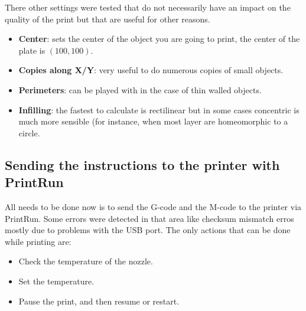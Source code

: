 \documentclass{article}
\begin{document}
There other settings were tested that do not necessarily have an impact on the quality of the print but that are useful for other reasons.
\begin{itemize}
\item \textbf{Center}: sets the center of the object you are going to print, the center of the plate is $(100, 100)$.
\item \textbf{Copies along X/Y}: very useful to do numerous copies of small objects.
\item \textbf{Perimeters}: can be played with in the case of thin walled objects.
\item \textbf{Infilling}: the fastest to calculate is rectilinear but in some cases concentric is much more sensible (for instance, when most layer are homeomorphic to a circle.
\end{itemize}

\subsection{Sending the instructions to the printer with PrintRun}
All needs to be done now is to send the G-code and the M-code to the printer via PrintRun. Some errors were detected in that area like checksum mismatch erros mostly due to problems with the USB port. The only actions that can be done while printing are:
\begin{itemize}
\item Check the temperature of the nozzle.
\item Set the temperature.
\item Pause the print, and then resume or restart.
\end{itemize}
\end{document}
